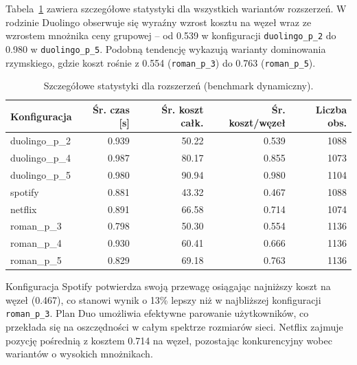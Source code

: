 Tabela~\ref{tab:ext-dynamic-detailed} zawiera szczegółowe statystyki dla wszystkich wariantów rozszerzeń. W rodzinie Duolingo obserwuje się wyraźny wzrost kosztu na węzeł wraz ze wzrostem mnożnika ceny grupowej -- od 0.539 w konfiguracji \texttt{duolingo\_p\_2} do 0.980 w \texttt{duolingo\_p\_5}. Podobną tendencję wykazują warianty dominowania rzymskiego, gdzie koszt rośnie z 0.554 (\texttt{roman\_p\_3}) do 0.763 (\texttt{roman\_p\_5}).

\begin{table}[H]
  \centering
  \caption{Szczegółowe statystyki dla rozszerzeń (benchmark dynamiczny).}
  \label{tab:ext-dynamic-detailed}
  \begin{tabular}{lrrrr}
    \toprule
    \textbf{Konfiguracja} & \textbf{Śr. czas [s]} & \textbf{Śr. koszt całk.} & \textbf{Śr. koszt/węzeł} & \textbf{Liczba obs.} \\
    \midrule
    duolingo\_p\_2        & 0.939                 & 50.22                    & 0.539                    & 1088                 \\
    duolingo\_p\_4        & 0.987                 & 80.17                    & 0.855                    & 1073                 \\
    duolingo\_p\_5        & 0.980                 & 90.94                    & 0.980                    & 1104                 \\
    spotify               & 0.881                 & 43.32                    & 0.467                    & 1088                 \\
    netflix               & 0.891                 & 66.58                    & 0.714                    & 1074                 \\
    roman\_p\_3           & 0.798                 & 50.30                    & 0.554                    & 1136                 \\
    roman\_p\_4           & 0.930                 & 60.41                    & 0.666                    & 1136                 \\
    roman\_p\_5           & 0.829                 & 69.18                    & 0.763                    & 1136                 \\
    \bottomrule
  \end{tabular}
\end{table}

Konfiguracja Spotify potwierdza swoją przewagę osiągając najniższy koszt na węzeł (0.467), co stanowi wynik o 13\% lepszy niż w najbliższej konfiguracji \texttt{roman\_p\_3}. Plan Duo umożliwia efektywne parowanie użytkowników, co przekłada się na oszczędności w całym spektrze rozmiarów sieci. Netflix zajmuje pozycję pośrednią z kosztem 0.714 na węzeł, pozostając konkurencyjny wobec wariantów o wysokich mnożnikach.

